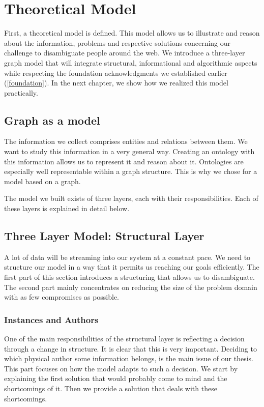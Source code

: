 \chapter{Theoretical Model}
\label{model}

First, a theoretical model is defined. This model allows us to illustrate and reason about the information, problems and respective solutions concerning our challenge to disambiguate people around the web. We introduce a three-layer graph model that will integrate structural, informational and algorithmic aspects while respecting the foundation acknowledgments we established earlier (\autoref{foundation}). In the next chapter, we show how we realized this model practically.

\section{Graph as a model}

The information we collect comprises entities and relations between them. We want to study this information in a very general way. Creating an ontology with this information allows us to represent it and reason about it. Ontologies are especially well representable within a graph structure. This is why we chose for a model based on a graph.

The model we built exists of three layers, each with their responsibilities. Each of these layers is explained in detail below.

\section{Three Layer Model: Structural Layer}
\label{structurallayer}

A lot of data will be streaming into our system at a constant pace. We need to structure our model in a way that it permits us reaching our goals efficiently. The first part of this section introduces a structuring that allows us to disambiguate. The second part mainly concentrates on reducing the size of the problem domain with as few compromises as possible.

\subsection{Instances and Authors}

One of the main responsibilities of the structural layer is reflecting a decision through a change in structure. It is clear that this is very important. Deciding to which physical author some information belongs, is the main issue of our thesis. This part focuses on how the model adapts to such a decision. We start by explaining the first solution that would probably come to mind and the shortcomings of it. Then we provide a solution that deals with these shortcomings.

